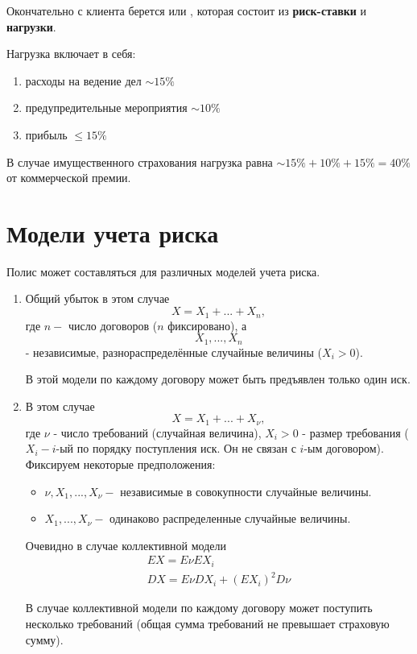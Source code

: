Окончательно с клиента берется  или , которая состоит из \textbf{риск-ставки} и \textbf{нагрузки}.

Нагрузка включает в себя:
\begin{enumerate}
	\item расходы на ведение дел $\sim 15\%$
	\item предупредительные мероприятия $\sim 10\%$
	\item прибыль $\leq 15\%$
\end{enumerate}

В случае имущественного страхования нагрузка равна $\sim 15\% + 10\% + 15\% = 40\%$ от коммерческой премии.

\section{Модели учета риска} %


Полис может составляться для различных моделей учета риска.
\begin{enumerate}
	\item {}

	Общий убыток в этом случае 
	\[X = X_1 + ...+X_n,\]
	где $n-$ число договоров ($n$ фиксировано), а 
	\[ X_1,..., X_n \]
	- независимые, разнораспределённые случайные величины ($X_i > 0$).

	В этой модели по каждому договору может быть предъявлен только один иск.

	\item {}
	В этом случае
	\[ X = X_1 + ... + X_{\nu},\]
	где $\nu$ - число требований (случайная величина), $X_i > 0$ - размер требования ($X_i - i$-ый по порядку поступления иск. Он не связан с $i$-ым договором).
	Фиксируем некоторые предположения:
	\begin{itemize}
		\item $\nu, X_1, ..., X_{\nu} - $ независимые в совокупности случайные величины.
		\item $ X_1, ..., X_{\nu} - $ одинаково распределенные случайные величины.
	\end{itemize}

	Очевидно в случае коллективной модели 
	\begin{gather*}
		EX = E\nu EX_i\\
		DX = E\nu DX_i + (EX_i)^2 D\nu 
	\end{gather*}

	В случае коллективной модели по каждому договору может поступить несколько требований (общая сумма требований не превышает страховую сумму).
\end{enumerate}

